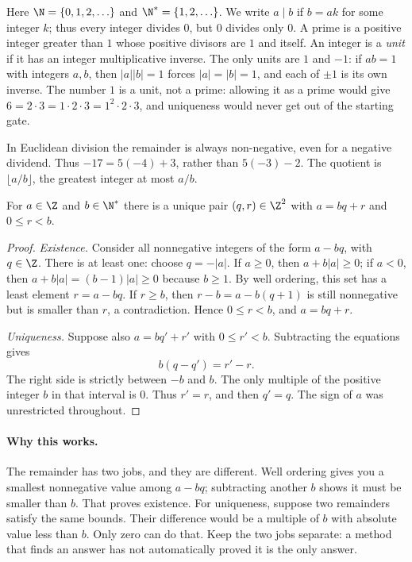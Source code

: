\begin{reminder}
Here $\N=\{0,1,2,\ldots\}$ and $\N^*=\{1,2,\ldots\}$. We write $a\mid b$ if $b=ak$ for some integer $k$;\label{sym:divides} thus every integer divides $0$, but $0$ divides only $0$. A prime is a positive integer greater than $1$ whose positive divisors are $1$ and itself. An integer is a \emph{unit} if it has an integer multiplicative inverse. The only units are $1$ and $-1$: if $ab=1$ with integers $a,b$, then $|a||b|=1$ forces $|a|=|b|=1$, and each of $\pm1$ is its own inverse. The number $1$ is a unit, not a prime: allowing it as a prime would give $6=2\cdot3=1\cdot2\cdot3=1^2\cdot2\cdot3$, and uniqueness would never get out of the starting gate.

In Euclidean division the remainder is always non-negative, even for a negative dividend. Thus $-17=5(-4)+3$, rather than $5(-3)-2$. The quotient is $\lfloor a/b\rfloor$, the greatest integer at most $a/b$.
\end{reminder}

\begin{theorem}\label{thm:div}
For $a\in\Z$ and $b\in\N^*$ there is a unique pair $(q,r)\in\Z^2$ with $a=bq+r$ and $0\le r<b$.
\end{theorem}
\begin{proof}
\emph{Existence.} Consider all nonnegative integers of the form
$a-bq$, with $q\in\Z$. There is at least one: choose $q=-|a|$.
If $a\ge0$, then $a+b|a|\ge0$; if $a<0$, then
$a+b|a|=(b-1)|a|\ge0$ because $b\ge1$.
By well ordering, this set has a least element $r=a-bq$.
If $r\ge b$, then $r-b=a-b(q+1)$ is still nonnegative
but is smaller than $r$, a contradiction.
Hence $0\le r<b$, and $a=bq+r$.

\emph{Uniqueness.} Suppose also $a=bq'+r'$ with $0\le r'<b$.
Subtracting the equations gives
\[
b(q-q')=r'-r.
\]
The right side is strictly between $-b$ and $b$.
The only multiple of the positive integer $b$ in that
interval is $0$. Thus $r'=r$, and then $q'=q$.
The sign of $a$ was unrestricted throughout.
\end{proof}

\paragraph{Why this works.}
The remainder has two jobs, and they are different. Well ordering gives you a smallest nonnegative value among $a-bq$; subtracting another $b$ shows it must be smaller than $b$. That proves existence. For uniqueness, suppose two remainders satisfy the same bounds. Their difference would be a multiple of $b$ with absolute value less than $b$. Only zero can do that. Keep the two jobs separate: a method that finds an answer has not automatically proved it is the only answer.


